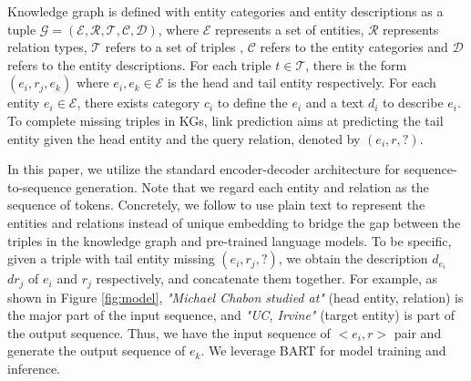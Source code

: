\documentclass[sigconf]{acmart}
\let\mc\multicolumn
\begin{document}
Knowledge graph is defined with entity categories and entity descriptions as a tuple $\mathcal{G}=(\mathcal{E}, \mathcal{R}, \mathcal{T}, \mathcal{C}, \mathcal{D})$, where $\mathcal{E}$ represents a set of entities, $\mathcal{R}$ represents relation types, $\mathcal{T}$ refers to a set of triples , $ \mathcal{C}$ refers to the entity categories and $ \mathcal{D}$ refers to the entity descriptions. 
For each triple $t \in \mathcal{T}$, there is the form $(e_i, r_j, e_k)$ where $e_i, e_k \in \mathcal{E}$ is the head and tail entity respectively. 
For each entity $e_i \in \mathcal{E}$, there exists category $c_i$ to define the $e_i$ and a text $d_i$ to describe $e_i$.
To complete missing triples in KGs, link prediction aims at predicting the tail entity given the head entity and the query relation, denoted by $(e_i, r, ?)$.

In this paper, we utilize the standard encoder-decoder architecture for sequence-to-sequence generation. 
Note that we regard each entity and relation as the sequence of tokens. 
Concretely, we follow \cite{kgbert} to use plain text to represent the entities and relations instead of unique embedding to bridge the gap between the triples in the knowledge graph and pre-trained language models.
To be specific, given a triple with tail entity missing $(e_i, r_j, ?)$, we obtain the description $d_{e_i}$ $d{r_j}$ of $e_i$ and $r_j$ respectively, and concatenate them together.
For example, as shown in Figure \ref{fig:model}, \textit{"Michael Chabon studied at"} (head entity, relation) is the major part of the input sequence, and \textit{"UC, Irvine"} (target entity) is part of the output sequence. 
Thus, we have the input sequence of $<e_i, r>$ pair and generate the output sequence of $e_k$. 
We leverage BART for model training and inference. 

\let\mc\multicolumn
\end{document}
